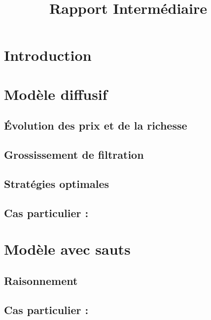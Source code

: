 \documentclass[11pt,letterpaper]{article}
\title{Rapport Intermédiaire}
\begin{document}



\pagebreak
\tableofcontents
\pagebreak

\section{Introduction}



\pagebreak
\section{Modèle diffusif}
%
\subsection{Évolution des prix et de la richesse}

\subsection{Grossissement de filtration}

\subsection{Stratégies optimales}

\subsection{Cas particulier : }


\pagebreak
\section{Modèle avec sauts}
\subsection{Raisonnement}

\subsection{Cas particulier : }


\pagebreak
\nocite{*}


\end{document}
